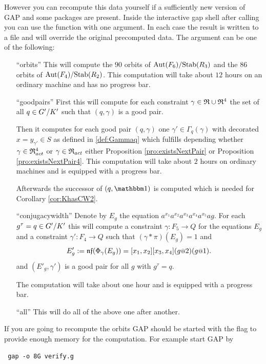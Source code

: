 \documentclass[a4paper,11pt]{amsart}
\begin{document}
However you can recompute this data yourself if a sufficiently new version of GAP and
some packages are present. Inside the interactive gap shell after calling 
you can use the function  with one argument. In each case
the result is written to a file and will override the original precomputed data. The 
argument can be one of the following:
\begin{itemize}
    \item [``orbits''] This will compute the $90$ orbits of ${\textup{Aut}(F_6)/\textup{Stab}(R_3)}$ and the
		       $86$ orbits of ${\textup{Aut}(F_4)/\textup{Stab}(R_2)}$. This computation will take
		       about $12$ hours on an ordinary machine and has no progress bar.
   \item [``goodpairs''] First this will compute for each constraint $\gamma\in\mathfrak{R}\cup\mathfrak{R}^4$ 
		      the set of all $q\in{G'/K'}$ such that $(q,\gamma)$ is a good pair.
		      
		      Then it computes for each good pair $(q,\gamma)$ one $\gamma'\in\Gamma_q(\gamma)$
		      with decorated $x=y_{\gamma'}\in S$ as defined in \ref{def:Gammaq} which 
		      fulfills depending whether $\gamma\in\mathfrak{R}^4_{act}$ or $\gamma\in\mathfrak{R}_{act}$ 
		      either Proposition \ref{pro:existsNextPair} or Proposition \ref{pro:existsNextPair4}.
		      This computation will take about $2$ hours on ordinary machines and is equipped 
		      with a progress bar. 
		      
		      Afterwards the successor of $(q,\id)$ is computed which is needed for 
		      Corollary \ref{cor:KhasCW2}. 
   \item [``conjugacywidth''] Denote by $E_g$ the equation $a^{x_1}a^{x_2}a^{x_3}a^{x_4}a^{x_5}ag$.
		      For each $g^\tau=q\in{G'/K'}$ this will compute a constraint 
		      $\gamma\colon F_5 \to Q$ for the equations $E_g$
		      and a constraint $\gamma'\colon F_4\to Q$ such that
		      $(\gamma * \pi)(E_g) = 1$ and 
		      \[E'_g := \nf(\Phi_\gamma(E_g))=[x_1,x_2][x_3,x_4](g\at{2})(g\at{1}).\] and
		      $(E'_g,\gamma')$ is a good pair for all $g$ with $g^\tau=q$.
		      
		      The computation will take about one hour and is equipped with a progress bar.
  \item [``all''] This will do all of the above one after another.		      
   \end{itemize}
If you are going to recompute the orbits GAP should be started with the  flag
to provide enough memory for the computation. For example start GAP by 
\begin{lstlisting}
 gap -o 8G verify.g
\end{lstlisting}
\end{document}

